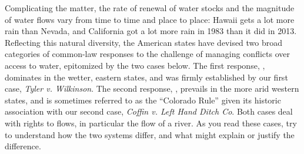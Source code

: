 Complicating the matter, the rate of renewal of water stocks and the magnitude
of water flows vary from time to time and place to place: Hawaii gets a lot more
rain than Nevada, and California got a lot more rain in 1983 than it did in
2013. Reflecting this natural diversity, the American states have devised two
broad categories of common-law responses to the challenge of managing conflicts
over access to water, epitomized by the two cases below. The first response,
, dominates in the wetter, eastern states, and was
firmly established by our first case, \textit{Tyler v. Wilkinson}. The second
response, , prevails in the more arid western
states, and is sometimes referred to as the ``Colorado Rule'' given its historic
association with our second case, \textit{Coffin v. Left Hand Ditch Co}. Both
cases deal with rights to flows, in particular the flow of a river. As you read
these cases, try to understand how the two systems differ, and what might
explain or justify the difference.

